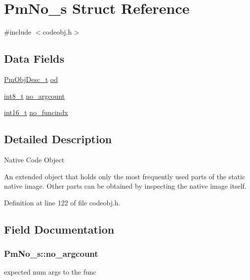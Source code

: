 \hypertarget{struct_pm_no__s}{\section{Pm\-No\-\_\-s Struct Reference}
\label{struct_pm_no__s}
}


{\ttfamily \#include $<$codeobj.\-h$>$}

\subsection*{Data Fields}
\begin{DoxyCompactItemize}
\item 
\hyperlink{obj_8h_a72d816790acd8eb550fb25268c2b3489}{Pm\-Obj\-Desc\-\_\-t} \hyperlink{struct_pm_no__s_ae78506fdb4937e7dd193add6fe7204bd}{od}
\item 
\hyperlink{stdint_8h_ad566f6541e98b74246db1a3a3a85ad49}{int8\-\_\-t} \hyperlink{struct_pm_no__s_a43b0db84f571295413f38638391acda1}{no\-\_\-argcount}
\item 
\hyperlink{stdint_8h_aa343fa3b3d06292b959ffdd4c4703b06}{int16\-\_\-t} \hyperlink{struct_pm_no__s_ae4a0895de1ab9eb9198e3c762b7a811e}{no\-\_\-funcindx}
\end{DoxyCompactItemize}


\subsection{Detailed Description}
Native Code Object

An extended object that holds only the most frequently used parts of the static native image. Other parts can be obtained by inspecting the native image itself. 

Definition at line 122 of file codeobj.\-h.



\subsection{Field Documentation}
\hypertarget{struct_pm_no__s_a43b0db84f571295413f38638391acda1}{
\subsubsection[{no\-\_\-argcount}]{ Pm\-No\-\_\-s\-::no\-\_\-argcount}}\label{struct_pm_no__s_a43b0db84f571295413f38638391acda1}
expected num args to the func 

